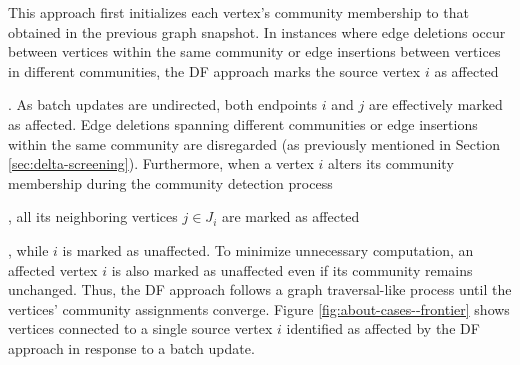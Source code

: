 This approach first initializes each vertex's community membership to that obtained in the previous graph snapshot. In instances where edge deletions occur between vertices within the same community or edge insertions between vertices in different communities, the DF approach marks the source vertex $i$ as affected. As batch updates are undirected, both endpoints $i$ and $j$ are effectively marked as affected. Edge deletions spanning different communities or edge insertions within the same community are disregarded (as previously mentioned in Section \ref{sec:delta-screening}). Furthermore, when a vertex $i$ alters its community membership during the community detection process, all its neighboring vertices $j \in J_i$ are marked as affected, while $i$ is marked as unaffected. To minimize unnecessary computation, an affected vertex $i$ is also marked as unaffected even if its community remains unchanged. Thus, the DF approach follows a graph traversal-like process until the vertices' community assignments converge. Figure \ref{fig:about-cases--frontier} shows vertices connected to a single source vertex $i$ identified as affected by the DF approach in response to a batch update.



